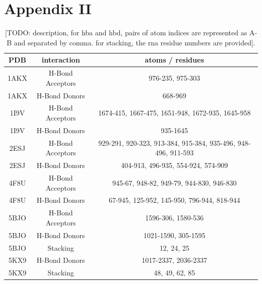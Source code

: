 \chapter*{Appendix II}


\begin{table}[H]
  \caption{\label{tab:appx2/plip} [TODO: description, for hba and hbd, pairs of atom indices are represented as A-B and separated by comma. for stacking, the rna residue numbers are provided].}
  \centering
  \begin{tabular}{ccc}
    \hline
    PDB  & interaction      & atoms / residues                                              \\ \hline
    1AKX & H-Bond Acceptors & 976-235, 975-303                                              \\
    1AKX & H-Bond Donors    & 668-969                                                       \\
    1I9V & H-Bond Acceptors & 1674-415, 1667-475, 1651-948, 1672-935, 1645-958              \\
    1I9V & H-Bond Donors    & 935-1645                                                      \\
    2ESJ & H-Bond Acceptors & 929-291, 920-323, 913-384, 915-384, 935-496, 948-496, 911-593 \\
    2ESJ & H-Bond Donors    & 404-913, 496-935, 554-924, 574-909                            \\
    4F8U & H-Bond Acceptors & 945-67, 948-82, 949-79, 944-830, 946-830                      \\
    4F8U & H-Bond Donors    & 67-945, 125-952, 145-950, 796-944, 818-944                    \\
    5BJO & H-Bond Acceptors & 1596-306, 1580-536                                            \\
    5BJO & H-Bond Donors    & 1021-1590, 305-1595                                           \\
    5BJO & Stacking         & 12, 24, 25                                                    \\
    5KX9 & H-Bond Donors    & 1017-2337, 2036-2337                                          \\
    5KX9 & Stacking         & 48, 49, 62, 85                                                \\

\end{tabular}
\end{table}
